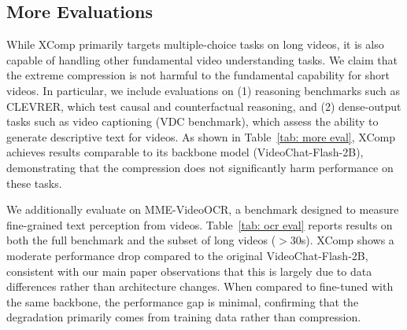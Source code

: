 \subsection{More Evaluations}

While XComp primarily targets multiple-choice tasks on long videos, it is also capable of handling other fundamental video understanding tasks. We claim that the extreme compression is not harmful to the fundamental capability for short videos. In particular, we include evaluations on (1) reasoning benchmarks such as CLEVRER, which test causal and counterfactual reasoning, and (2) dense-output tasks such as video captioning (VDC benchmark), which assess the ability to generate descriptive text for videos. As shown in Table~\ref{tab: more eval}, XComp achieves results comparable to its backbone model (VideoChat-Flash-2B), demonstrating that the compression does not significantly harm performance on these tasks.

We additionally evaluate on MME-VideoOCR, a benchmark designed to measure fine-grained text perception from videos. Table~\ref{tab: ocr eval} reports results on both the full benchmark and the subset of long videos ($>$30s). XComp shows a moderate performance drop compared to the original VideoChat-Flash-2B, consistent with our main paper observations that this is largely due to data differences rather than architecture changes. When compared to fine-tuned with the same backbone, the performance gap is minimal, confirming that the degradation primarily comes from training data rather than compression.


\begin{table}[h]
\renewcommand{\thetable}{F}
\centering
\caption{\textbf{CLEVRER and VDC results.}}
\label{tab: more eval}
\vspace{3pt}
\end{table}


